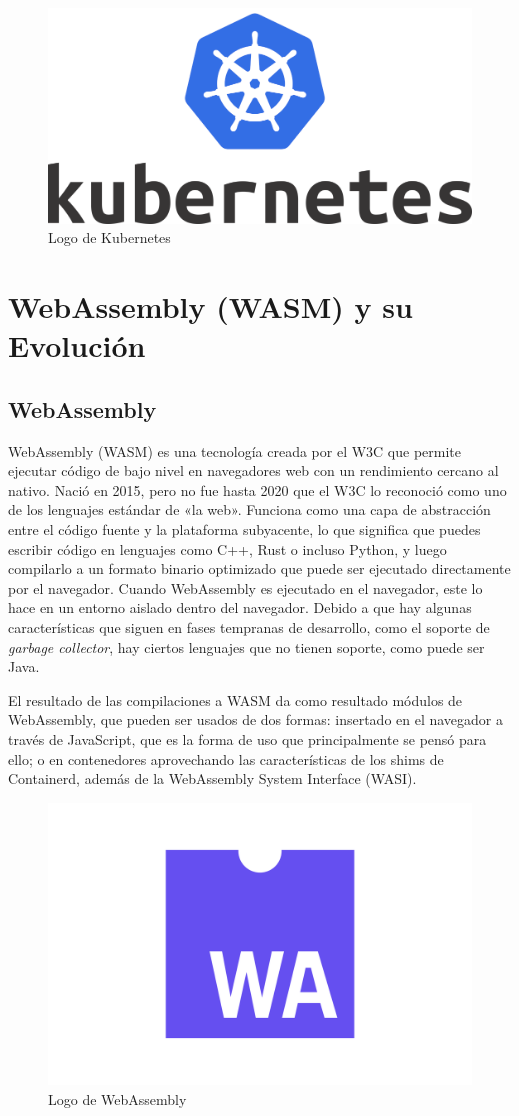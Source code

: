 \begin{figure}[h!]
    \centering
    \includegraphics[width=0.5\linewidth]{figures/kubernetes-logo.png}
    \caption{Logo de Kubernetes}
    \label{fig:kubernetes-logo}
\end{figure}

\section{WebAssembly (WASM) y su Evolución}

\subsection{WebAssembly}

WebAssembly (WASM) es una tecnología creada por el W3C que permite ejecutar código de bajo nivel en navegadores web con un rendimiento cercano al nativo. Nació en 2015, pero no fue hasta 2020 que el W3C lo reconoció como uno de los lenguajes estándar de «la web». Funciona como una capa de abstracción entre el código fuente y la plataforma subyacente, lo que significa que puedes escribir código en lenguajes como C++, Rust o incluso Python, y luego compilarlo a un formato binario optimizado que puede ser ejecutado directamente por el navegador. Cuando WebAssembly es ejecutado en el navegador, este lo hace en un entorno aislado dentro del navegador. Debido a que hay algunas características que siguen en fases tempranas de desarrollo, como el soporte de \textit{garbage collector}, hay ciertos lenguajes que no tienen soporte, como puede ser Java.

El resultado de las compilaciones a WASM da como resultado módulos de WebAssembly, que pueden ser usados de dos formas: insertado en el navegador a través de JavaScript, que es la forma de uso que principalmente se pensó para ello; o en contenedores aprovechando las características de los shims de Containerd, además de la WebAssembly System Interface (WASI).

\begin{figure}[h!]
    \centering
    \includegraphics[width=0.5\linewidth]{figures/WebAssembly-Logo.png}
    \caption{Logo de WebAssembly}
    \label{fig:WebAssembly-Logo}
\end{figure}

